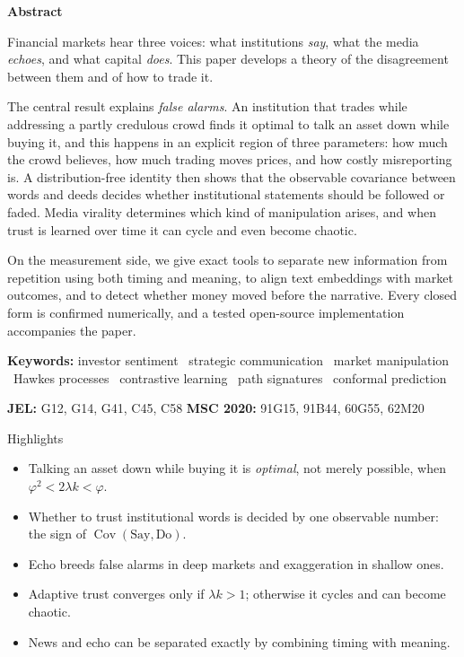 \documentclass[11pt,a4paper]{article}
\theoremstyle{sci}
\theoremstyle{scidef}
\DeclareMathOperator{\Cov}{Cov}
\begin{document}
\begin{tcolorbox}[enhanced,colback=ink!3,colframe=ink!3,arc=0pt,outer arc=0pt,left=12pt,right=12pt,top=8pt,bottom=8pt,fontupper=\small,before upper={\setlength{\parskip}{0.5em}},
  borderline north={0.6pt}{0pt}{ink!30},borderline south={0.6pt}{0pt}{ink!30}]
{\sffamily\bfseries\color{sNavy} Abstract}\par\smallskip
Financial markets hear three voices: what institutions \emph{say}, what the media \emph{echoes}, and what capital \emph{does}. This paper develops a theory of the disagreement between them and of how to trade it.

The central result explains \emph{false alarms}. An institution that trades while addressing a partly credulous crowd finds it optimal to talk an asset down while buying it, and this happens in an explicit region of three parameters: how much the crowd believes, how much trading moves prices, and how costly misreporting is. A distribution-free identity then shows that the observable covariance between words and deeds decides whether institutional statements should be followed or faded. Media virality determines which kind of manipulation arises, and when trust is learned over time it can cycle and even become chaotic.

On the measurement side, we give exact tools to separate new information from repetition using both timing and meaning, to align text embeddings with market outcomes, and to detect whether money moved before the narrative. Every closed form is confirmed numerically, and a tested open-source implementation accompanies the paper.

\medskip
{\sffamily\small\textbf{Keywords:} investor sentiment \textbullet\ strategic communication \textbullet\ market manipulation \textbullet\ Hawkes processes \textbullet\ contrastive learning \textbullet\ path signatures \textbullet\ conformal prediction\par}
{\sffamily\small\textbf{JEL:} G12, G14, G41, C45, C58 \qquad \textbf{MSC 2020:} 91G15, 91B44, 60G55, 62M20\par}
\end{tcolorbox}

\begin{keybox}{Highlights}
\begin{itemize}[leftmargin=1.2em,itemsep=2pt,topsep=0pt]
  \item Talking an asset down while buying it is \emph{optimal}, not merely possible, when $\varphi^2<2\lambda k<\varphi$.
  \item Whether to trust institutional words is decided by one observable number: the sign of $\Cov(\text{Say},\text{Do})$.
  \item Echo breeds false alarms in deep markets and exaggeration in shallow ones.
  \item Adaptive trust converges only if $\lambda k>1$; otherwise it cycles and can become chaotic.
  \item News and echo can be separated exactly by combining timing with meaning.
\end{itemize}
\end{keybox}
\end{document}
